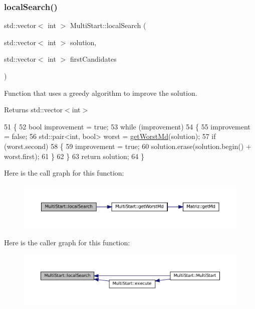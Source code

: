 \subsubsection{\texorpdfstring{local\+Search()}{localSearch()}}
{\footnotesize\ttfamily std\+::vector$<$ int $>$ Multi\+Start\+::local\+Search (\begin{DoxyParamCaption}\item[{std\+::vector$<$ int $>$}]{solution,  }\item[{std\+::vector$<$ int $>$}]{first\+Candidates }\end{DoxyParamCaption})}



Function that uses a greedy algorithm to improve the solution. 

\begin{DoxyReturn}{Returns}
std\+::vector$<$int$>$ 
\end{DoxyReturn}

\begin{DoxyCode}
51 \{
52   \textcolor{keywordtype}{bool} improvement = \textcolor{keyword}{true};
53   \textcolor{keywordflow}{while} (improvement)
54   \{
55     improvement = \textcolor{keyword}{false};
56     std::pair<int, bool> worst = \hyperlink{classMultiStart_a0ad5ed40a5c4ab964cb27f79343eed98}{getWorstMd}(solution);
57     \textcolor{keywordflow}{if} (worst.second)
58     \{
59       improvement = \textcolor{keyword}{true};
60       solution.erase(solution.begin() + worst.first);
61     \}
62   \}
63   \textcolor{keywordflow}{return} solution;
64 \}
\end{DoxyCode}
Here is the call graph for this function\+:
\nopagebreak
\begin{figure}[H]
\begin{center}
\leavevmode
\includegraphics[width=350pt]{classMultiStart_af27ae5dbba5f924070f103b7bf5987a3_cgraph}
\end{center}
\end{figure}
Here is the caller graph for this function\+:
\nopagebreak
\begin{figure}[H]
\begin{center}
\leavevmode
\includegraphics[width=350pt]{classMultiStart_af27ae5dbba5f924070f103b7bf5987a3_icgraph}
\end{center}
\end{figure}
\mbox{\label{classMultiStart_a456dc441b6e7028aa86a0488830f9bc1}} 
